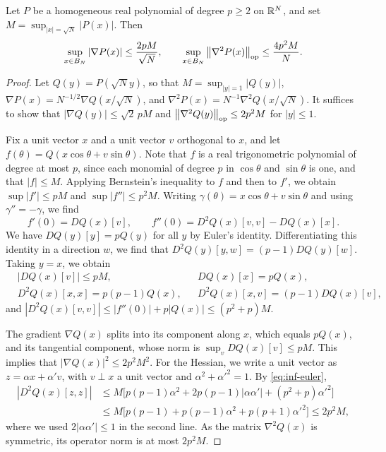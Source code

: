 \begin{lemma}\label{lem:inf-tensor}
Let $P$ be a homogeneous real polynomial of degree $p\ge2$ on $\mathbb R^N$, and set $M=\sup_{|x|=\sqrt N}|P(x)|$. Then
\begin{equation}\label{eq:inf-tensor}
\sup_{x\in B_N}|\nabla P(x)|\le\frac{2pM}{\sqrt N},\qquad\sup_{x\in B_N}\left\lVert\nabla^2P(x)\right\rVert_{\mathrm{op}}\le\frac{4p^2M}{N}.
\end{equation}
\end{lemma}

\begin{proof}
Let $Q(y)=P(\sqrt Ny)$, so that $M=\sup_{|y|=1}|Q(y)|$, $\nabla P(x)=N^{-1/2}\nabla Q(x/\sqrt N)$, and $\nabla^2P(x)=N^{-1}\nabla^2Q(x/\sqrt N)$. It suffices to show that $|\nabla Q(y)|\le\sqrt2\,pM$ and $\left\lVert\nabla^2Q(y)\right\rVert_{\mathrm{op}}\le2p^2M$ for $|y|\le1$.

Fix a unit vector $x$ and a unit vector $v$ orthogonal to $x$, and let $f(\theta)=Q(x\cos\theta+v\sin\theta)$. Note that $f$ is a real trigonometric polynomial of degree at most $p$, since each monomial of degree $p$ in $\cos\theta$ and $\sin\theta$ is one, and that $|f|\le M$. Applying Bernstein's inequality \cite[Theorem~1.1]{QueffelecZarouf2019} to $f$ and then to $f'$, we obtain $\sup|f'|\le pM$ and $\sup|f''|\le p^2M$. Writing $\gamma(\theta)=x\cos\theta+v\sin\theta$ and using $\gamma''=-\gamma$, we find
\begin{equation*}
f'(0)=DQ(x)[v],\qquad f''(0)=D^2Q(x)[v,v]-DQ(x)[x].
\end{equation*}
We have $DQ(y)[y]=pQ(y)$ for all $y$ by Euler's identity. Differentiating this identity in a direction $w$, we find that $D^2Q(y)[y,w]=(p-1)DQ(y)[w]$. Taking $y=x$, we obtain
\begin{equation}\label{eq:inf-euler}
\begin{aligned}
&|DQ(x)[v]|\le pM, && DQ(x)[x]=pQ(x),\\
&D^2Q(x)[x,x]=p(p-1)Q(x), && D^2Q(x)[x,v]=(p-1)DQ(x)[v],
\end{aligned}
\end{equation}
and $|D^2Q(x)[v,v]|\le|f''(0)|+p|Q(x)|\le(p^2+p)M$.

The gradient $\nabla Q(x)$ splits into its component along $x$, which equals $pQ(x)$, and its tangential component, whose norm is $\sup_vDQ(x)[v]\le pM$. This implies that $|\nabla Q(x)|^2\le2p^2M^2$. For the Hessian, we write a unit vector as $z=\alpha x+\alpha'v$, with $v\perp x$ a unit vector and $\alpha^2+\alpha'^2=1$. By \eqref{eq:inf-euler},
\begin{equation*}
\begin{split}
|D^2Q(x)[z,z]|&\le M\bigl[p(p-1)\alpha^2+2p(p-1)|\alpha\alpha'|+(p^2+p)\alpha'^2\bigr]\\
&\le M\bigl[p(p-1)+p(p-1)\alpha^2+p(p+1)\alpha'^2\bigr]\le2p^2M,
\end{split}
\end{equation*}
where we used $2|\alpha\alpha'|\le1$ in the second line. As the matrix $\nabla^2Q(x)$ is symmetric, its operator norm is at most $2p^2M$.


\end{proof}
